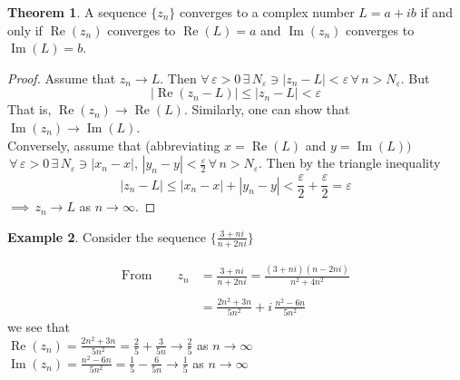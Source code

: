 \documentclass[11pt,a4paper]{article}
\theoremstyle{definition}
\newtheorem{thm}{Theorem}[section]
\newtheorem{example}[thm]{Example}
\begin{document}
\begin{thm}
A sequence $\{z_n\}$ converges to a complex number $L = a + ib$ if and only if $\operatorname{Re}(z_n)$ converges to $\operatorname{Re}(L)= a$ and $\operatorname{Im}(z_n)$ converges to $\operatorname{Im}(L) = b$.
\end{thm}

\begin{proof}
Assume that $z_n \longrightarrow L$. Then $\forall \, \varepsilon > 0\, \exists\, N_{\varepsilon} \ni \left|z_n - L\right| < \varepsilon\, \forall\, n> N_{\varepsilon}$. But $$\left|\operatorname{Re}(z_n - L)\right| \leq \left|z_n - L\right|< \varepsilon$$
That is, $\operatorname{Re}(z_n) \longrightarrow \operatorname{Re}(L)$. Similarly, one can show that $\operatorname{Im}(z_n) \longrightarrow \operatorname{Im} (L)$.\\

Conversely, assume that (abbreviating $x = \operatorname{Re} (L)$ and $y = \operatorname{Im} (L))$\\ $\, \forall\, \varepsilon > 0\,  \exists\, N_{\varepsilon} \ni \left|x_n - x\right|,\,\left|y_n - y\right| < \frac{\varepsilon}{2}\,\forall\,n>N_{\varepsilon}$. Then by the triangle inequality $$ \left|z_n - L\right| \leq \left|x_n - x\right| + \left|y_n - y\right| < \frac{\varepsilon}{2} + \frac{\varepsilon}{2} = \varepsilon$$
$\implies\,  z_n \longrightarrow L$ as $n \longrightarrow \infty.$
\end{proof}

\begin{example}
Consider the sequence $\displaystyle{\Big\{\frac{3 + ni}{n + 2ni}\Big\}}$
\end{example}

\pagebreak
\text{\textcolor{red}{Solution}}
\begin{align*}
\text{From}\qquad  z_n & = \frac{3 + ni}{n + 2ni} = \frac{(3 + ni) (n-2ni)}{n^2 + 4n^2}\\\\
& = \frac{2n^2 + 3n}{5n^2} + i\,\frac{n^2 - 6n}{5n^2}
\end{align*}
we see that\\

$\operatorname{Re}(z_n) = \frac{2n^2 + 3n}{5n^2} = \frac{2}{5} + \frac{3}{5n} \longrightarrow \frac{2}{5}$ as $n\longrightarrow \infty$\\

$\operatorname{Im}(z_n) = \frac{n^2 - 6n}{5n^2} = \frac{1}{5} - \frac{6}{5n}\longrightarrow \frac{1}{5}$ as $n \longrightarrow \infty$\\
\end{document}
